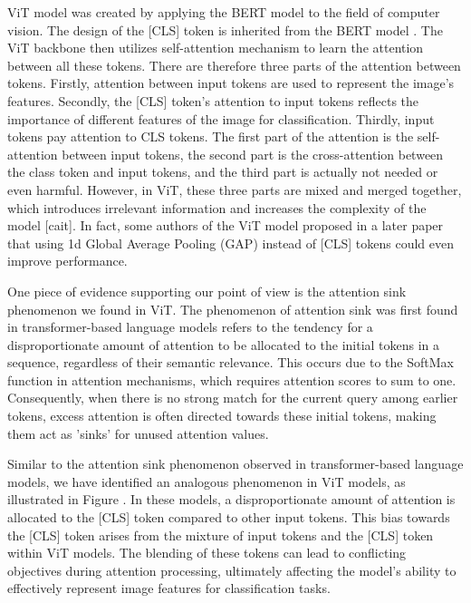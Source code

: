 \documentclass[anon,12pt]{colt2024} %
\begin{document}
ViT model was created by applying the BERT model to the field of computer vision.
The design of the [CLS] token is inherited from the BERT model \cite{devlin2018bert}.%
The ViT backbone then utilizes self-attention mechanism to learn the attention between all these tokens.
There are therefore three parts of the attention between tokens. Firstly, attention between input tokens are used to represent the image's features. Secondly, the [CLS] token's attention to input tokens reflects the importance of different features of the image for classification. Thirdly, input tokens pay attention to CLS tokens.
The first part of the attention is the self-attention between input tokens, the second part is the cross-attention between the class token and input tokens, and the third part is actually not needed or even harmful.
However, in ViT, these three parts are mixed and merged together, which introduces irrelevant information and increases the complexity of the model [cait].
In fact, some authors of the ViT model proposed in a later paper \cite{beyer2022better} that using 1d Global Average Pooling (GAP) instead of [CLS] tokens could even improve performance.

One piece of evidence supporting our point of view is the attention sink phenomenon we found in ViT.
The phenomenon of attention sink was first found in transformer-based language models \cite{xiaoefficient} refers to the tendency for a disproportionate amount of attention to be allocated to the initial tokens in a sequence, regardless of their semantic relevance.
This occurs due to the SoftMax function in attention mechanisms, which requires attention scores to sum to one.
Consequently, when there is no strong match for the current query among earlier tokens, excess attention is often directed towards these initial tokens, making them act as 'sinks' for unused attention values.

Similar to the attention sink phenomenon observed in transformer-based language models, we have identified an analogous phenomenon in ViT models, as illustrated in Figure . In these models, a disproportionate amount of attention is allocated to the [CLS] token compared to other input tokens.
This bias towards the [CLS] token arises from the mixture of input tokens and the [CLS] token within ViT models.
The blending of these tokens can lead to conflicting objectives during attention processing, ultimately affecting the model's ability to effectively represent image features for classification tasks. 
\end{document}
